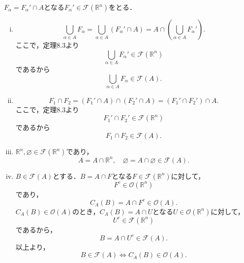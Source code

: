 \begin{tproof}
    $F_\alpha = F_{\alpha} ' \cap A$となる$F_{\alpha} ' \in \mathcal{F} (\mathbb{R}^n)$をとる．
    \begin{enumerate}[(i)]
        \item
              \[
                  \bigcup_{\alpha \in A} F_\alpha  = \bigcup_{\alpha \in A} (F_{\alpha} ' \cap A) = A \cap (\bigcup_{\alpha \in A} F_{\alpha} ').
              \]
              ここで，定理8.3より
              \[
                  \bigcup_{\alpha \in A} F_{\alpha} ' \in \mathcal{F} (\mathbb{R}^n)
              \]
              であるから
              \[
                  \bigcup_{\alpha \in A} F_\alpha \in \mathcal{F} (A).
              \]
        \item
              \[
                  F_1 \cap F_2  = (F_1 ' \cap A) \cap (F_2 ' \cap A) = (F_1 ' \cap F_2 ') \cap A.
              \]
              ここで，定理8.3より
              \[
                  F_1 ' \cap F_2 ' \in \mathcal{F} (\mathbb{R}^n)
              \]
              であるから
              \[
                  F_1 \cap F_2 \in \mathcal{F} (A).
              \]
        \item
              $\mathbb{R}^n, \varnothing \in \mathcal{F} (\mathbb{R}^n)$であり，
              \[
                  A = A \cap \mathbb{R}^n, \quad \varnothing = A \cap \varnothing \in \mathcal{F} (A).
              \]
        \item $B \in \mathcal{F} (A)$とする．$B =  A \cap F$となる$F \in \mathcal{F} (\mathbb{R}^n)$に対して，
              \[
                  F^c\in \mathcal{O} (\mathbb{R}^n)
              \]
              であり，
              \[
                  C_A (B) = A \cap F^c \in \mathcal{O} (A).
              \]
              $C_A (B) \in \mathcal{O}(A)$のとき，$C_A (B) = A \cap U$となる$U \in \mathcal{O} (\mathbb{R}^n)$に対して，
              \[
                  U^c \in \mathcal{F} (\mathbb{R}^n)
              \]
              であるから，
              \[
                  B = A \cap U^c \in \mathcal{F} (A).
              \]
              以上より，
              \[
                  B \in \mathcal{F} (A) \iff C_A (B) \in \mathcal{O} (A).
              \]
    \end{enumerate}
\end{tproof}


